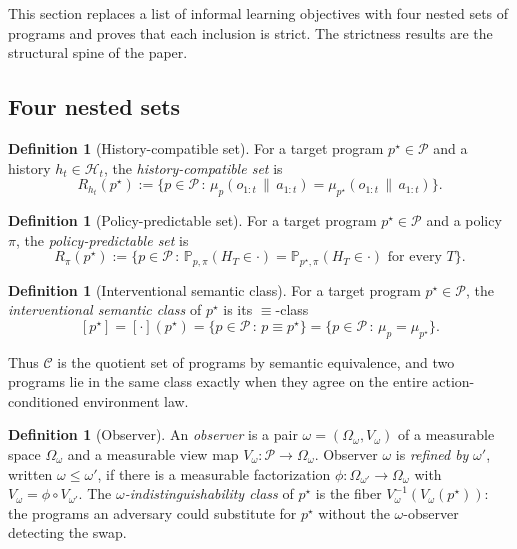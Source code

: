 \documentclass[11pt]{article}
\theoremstyle{definition}
\newtheorem{definition}[theorem]{Definition}
\theoremstyle{remark}
\newcommand{\Ccal}{\mathcal{C}}
\newcommand{\Pcal}{\mathcal{P}}
\newcommand{\Hcal}{\mathcal{H}}
\newcommand{\Prob}{\mathbb{P}}
\newcommand{\givena}{\,\|\,}
\begin{document}
This section replaces a list of informal learning objectives with four nested sets of programs and proves that each inclusion is strict. The strictness results are the structural spine of the paper.

\subsection{Four nested sets}

\begin{definition}[History-compatible set]
\label{def:history-compat}
For a target program $p^\star\in\Pcal$ and a history $h_t\in\Hcal_t$, the \emph{history-compatible set} is
\[
R_{h_t}(p^\star)
:=
\bigl\{p\in\Pcal\,:\,\mu_p(o_{1:t}\givena a_{1:t})=\mu_{p^\star}(o_{1:t}\givena a_{1:t})\bigr\}.
\]
\end{definition}

\begin{definition}[Policy-predictable set]
\label{def:policy-pred}
For a target program $p^\star\in\Pcal$ and a policy $\pi$, the \emph{policy-predictable set} is
\[
R_\pi(p^\star)
:=
\bigl\{p\in\Pcal\,:\,\Prob_{p,\pi}(H_T\in\cdot)=\Prob_{p^\star,\pi}(H_T\in\cdot)\text{ for every }T\bigr\}.
\]
\end{definition}

\begin{definition}[Interventional semantic class]
\label{def:int-sem-class}
For a target program $p^\star\in\Pcal$, the \emph{interventional semantic class} of $p^\star$ is its $\equiv$-class
\[
[p^\star]
=
[\cdot](p^\star)
=
\bigl\{p\in\Pcal\,:\,p\equiv p^\star\bigr\}
=
\bigl\{p\in\Pcal\,:\,\mu_p=\mu_{p^\star}\bigr\}.
\]
\end{definition}

Thus $\Ccal$ is the quotient set of programs by semantic equivalence, and two programs lie in the same class exactly when they agree on the entire action-conditioned environment law.

\begin{definition}[Observer]
\label{def:observer}
An \emph{observer} is a pair $\omega=(\Omega_\omega,V_\omega)$ of a measurable space $\Omega_\omega$ and a measurable view map $V_\omega:\Pcal\to\Omega_\omega$. Observer $\omega$ is \emph{refined by} $\omega'$, written $\omega\le\omega'$, if there is a measurable factorization $\phi:\Omega_{\omega'}\to\Omega_\omega$ with $V_\omega=\phi\circ V_{\omega'}$. The \emph{$\omega$-indistinguishability class} of $p^\star$ is the fiber $V_\omega^{-1}(V_\omega(p^\star))$: the programs an adversary could substitute for $p^\star$ without the $\omega$-observer detecting the swap.
\end{definition}
\end{document}

